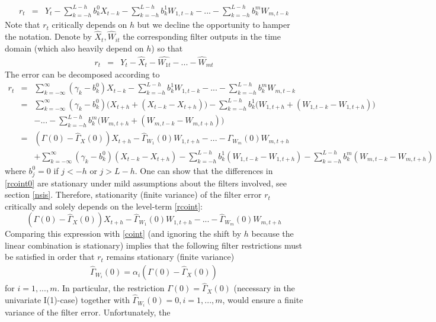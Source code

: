 \documentclass[11pt]{article}
\begin{document}
\begin{eqnarray*}
r_t&=&Y_{t}-\sum_{k=-h}^{L-h}b_k^0X_{t-k}-\sum_{k=-h}^{L-h}{b}_{k}^1 W_{1,t-k}-...-\sum_{k= -h}^{L-h}{b}_{k}^m
W_{m,t-k}
\end{eqnarray*}
Note that $r_t$ critically depends on $h$ but we decline the opportunity to hamper the notation. Denote by $\hat{X}_t,\hat{W}_{it}$ the corresponding filter outputs in the time domain (which also heavily depend on $h$) so that
\begin{eqnarray*}
r_t&=&Y_{t}-\hat{X}_t-\hat{W_{1t}}-...-\hat{W}_{mt}
\end{eqnarray*}
The error can be decomposed according to
\begin{eqnarray}
r_{t}&=&\sum_{k=-\infty}^\infty(\gamma_{k}-b_k^0)X_{t-k}-\sum_{k=-h}^{L-h}b_{k}^1
W_{1,t-k}-...-\sum_{k=-h}^{L-h}b_{k}^m W_{m,t-k}\nonumber\\
&=&\sum_{k=-\infty}^\infty(\gamma_{k}-b_k^0)\Big(X_{t+h}+(X_{t-k}-X_{t+h})\Big)-\sum_{k=-h}^{L-h}b_{k}^1
\Big(W_{1,t+h}+(W_{1,t-k}-W_{1,t+h})\Big)\nonumber\\
&&-...-\sum_{k=-h}^{L-h}b_{k}^m
\Big(W_{m,t+h}+(W_{m,t-k}-W_{m,t+h})\Big)\nonumber\\
&=&(\Gamma(0)-\hat{\Gamma}_X(0))X_{t+h}-\hat{\Gamma}_{W_1}(0)W_{1,t+h}-...-\hat{\Gamma}_{W_m}(0)W_{m,t+h}\label{rcoint}\\
&&+\sum_{k=-\infty}^\infty(\gamma_{k}-b_k^0)(X_{t-k}-X_{t+h})-\sum_{k=-h}^{L-h}b_{k}^1 (W_{1,t-k}-W_{1,t+h})-\sum_{k=-h}^{L-h}b_{k}^m(W_{m,t-k}-W_{m,t+h})\label{rcoint0}
\end{eqnarray}
where $b_j^0=0$ if $j<-h$ or $j>L-h$. One can show  that the differences in \ref{rcoint0} are stationary under mild  assumptions about the filters involved, see section \ref{nsis}. Therefore, stationarity (finite variance) of the filter error $r_t$ critically and solely depends on the level-term \ref{rcoint}:
\[(\Gamma(0)-\hat{\Gamma}_X(0)){X}_{t+h}-\hat{\Gamma}_{W_1}(0){W}_{1,t+h}-...-\hat{\Gamma}_{W_m}(0){W}_{m,t+h}\]
Comparing this expression with \ref{coint} (and ignoring the shift by $h$ because the linear combination is stationary) implies that the
following filter restrictions must be satisfied in order that $r_t$ remains stationary (finite variance)
\begin{eqnarray}\label{filcoincon}
\hat{\Gamma}_{W_i}(0)=\alpha_i(\Gamma(0)-\hat{\Gamma}_X(0))
\end{eqnarray}
for $i=1,...,m$. In particular,  the restriction
$\Gamma(0)=\hat{\Gamma}_X(0)$ (necessary in the univariate I(1)-case)
together with $\hat{\Gamma}_{W_i}(0)=0, i=1,...,m$, would ensure a finite variance of the filter error.  Unfortunately, the
\end{document}
